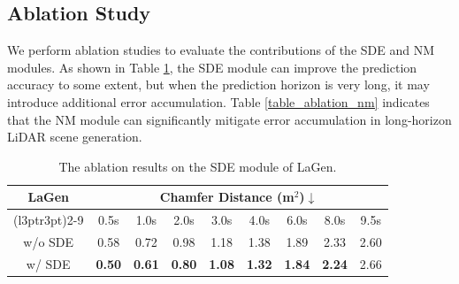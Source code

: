 
\subsection{Ablation Study}
We perform ablation studies to evaluate the contributions of the SDE and NM modules. 
As shown in Table \ref{table_ablation_sde}, the SDE module can improve the prediction accuracy to some extent, 
but when the prediction horizon is very long, it may introduce additional error accumulation.
Table \ref{table_ablation_nm} indicates that the NM module can significantly mitigate error accumulation in long-horizon LiDAR scene generation.

\vspace{-1mm}

\begin{table}[ht]
\centering
\caption{The ablation results on the SDE module of LaGen.}
\vspace{-1mm}
\setlength{\tabcolsep}{3pt}
\renewcommand{\arraystretch}{1.17}
\begin{tabular}{ccccccccc}
\toprule
 \textbf{LaGen} &
\multicolumn{8}{c}{\textbf{Chamfer Distance (m$^2$)$\downarrow$}} \\
\cmidrule(l{3pt}r{3pt}){2-9} 
& 0.5s & 1.0s & 2.0s & 3.0s & 4.0s & 6.0s & 8.0s & 9.5s \\ 
\midrule
w/o SDE
&0.58 & 0.72 & 0.98 & 1.18 & 1.38 & 1.89 & 2.33 & 2.60  \\
\midrule
w/ SDE
& \textbf{0.50} & \textbf{0.61} & \textbf{0.80} & \textbf{1.08} & \textbf{1.32} & \textbf{1.84} & \textbf{2.24} &  2.66\\
\bottomrule
\end{tabular}
\label{table_ablation_sde}
\vspace{-4mm}
\end{table}

